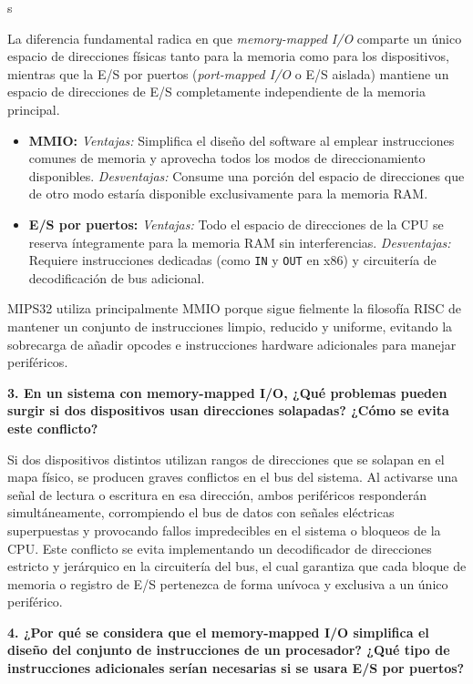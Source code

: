 s\documentclass[11pt,a4paper]{article}
\begin{document}
\vspace{0.5cm}
La diferencia fundamental radica en que \textit{memory-mapped I/O} comparte un único espacio de direcciones físicas tanto para la memoria como para los dispositivos, mientras que la E/S por puertos (\textit{port-mapped I/O} o E/S aislada) mantiene un espacio de direcciones de E/S completamente independiente de la memoria principal. 
\begin{itemize}
    \item \textbf{MMIO:} \textit{Ventajas:} Simplifica el diseño del software al emplear instrucciones comunes de memoria y aprovecha todos los modos de direccionamiento disponibles. \textit{Desventajas:} Consume una porción del espacio de direcciones que de otro modo estaría disponible exclusivamente para la memoria RAM.
    \item \textbf{E/S por puertos:} \textit{Ventajas:} Todo el espacio de direcciones de la CPU se reserva íntegramente para la memoria RAM sin interferencias. \textit{Desventajas:} Requiere instrucciones dedicadas (como \texttt{IN} y \texttt{OUT} en x86) y circuitería de decodificación de bus adicional.
\end{itemize}
MIPS32 utiliza principalmente MMIO porque sigue fielmente la filosofía RISC de mantener un conjunto de instrucciones limpio, reducido y uniforme, evitando la sobrecarga de añadir opcodes e instrucciones hardware adicionales para manejar periféricos.

\vspace{0.4cm}
\noindent\textbf{3. En un sistema con memory-mapped I/O, ¿Qué problemas pueden surgir si dos dispositivos usan direcciones solapadas? ¿Cómo se evita este conflicto?}

\vspace{0.5cm}
Si dos dispositivos distintos utilizan rangos de direcciones que se solapan en el mapa físico, se producen graves conflictos en el bus del sistema. Al activarse una señal de lectura o escritura en esa dirección, ambos periféricos responderán simultáneamente, corrompiendo el bus de datos con señales eléctricas superpuestas y provocando fallos impredecibles en el sistema o bloqueos de la CPU. Este conflicto se evita implementando un decodificador de direcciones estricto y jerárquico en la circuitería del bus, el cual garantiza que cada bloque de memoria o registro de E/S pertenezca de forma unívoca y exclusiva a un único periférico.

\vspace{0.4cm}
\noindent\textbf{4. ¿Por qué se considera que el memory-mapped I/O simplifica el diseño del conjunto de instrucciones de un procesador? ¿Qué tipo de instrucciones adicionales serían necesarias si se usara E/S por puertos?}
\end{document}
